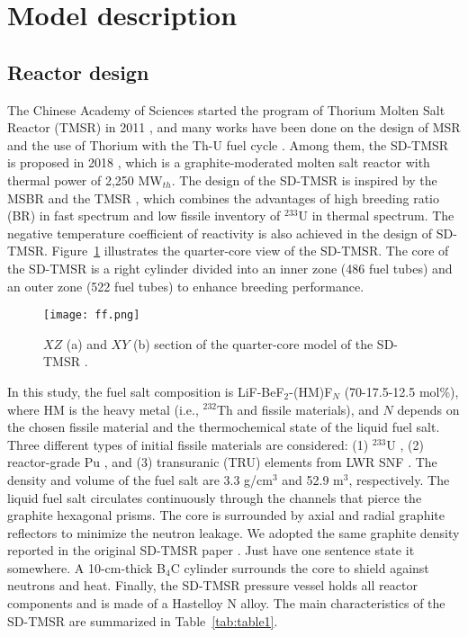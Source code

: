 \section{Model description} \label{Model-description}
\subsection{Reactor design}

The Chinese Academy of Sciences started the program of Thorium Molten Salt Reactor (TMSR) in 2011 \cite{jiang2012advanced}, and many works have been done on the design of MSR and the use of Thorium with the Th-U fuel cycle \cite{li_optimization_2018,li2015analysis}. Among them, the SD-TMSR is proposed in 2018 \cite{li_optimization_2018}, which is a graphite-moderated molten salt reactor with thermal power of 2,250 MW$_{th}$. The design of the SD-TMSR is inspired by the \gls{MSBR} \cite{robertson_conceptual_1971} and the \gls{TMSR} \cite{nuttin2005potential}, which combines the advantages of high breeding ratio (BR) in fast spectrum and low fissile inventory of $^{233}$U in thermal spectrum. The negative temperature coefficient of reactivity is also achieved in the design of SD-TMSR. Figure~\ref{fig:ff} illustrates the quarter-core view of the 
SD-TMSR. The core of the 
SD-TMSR is a right cylinder divided into an inner zone (486 fuel tubes) 
and an outer zone (522 fuel tubes) to enhance breeding performance.
\begin{figure} %
	\texttt{[image: ff.png]}
	\caption{$XZ$ (a) and $XY$ (b) section of the quarter-core model of the 
		SD-TMSR \cite{ashraf2019Preliminary}.}
	\label{fig:ff}
\end{figure}
In this study, the fuel salt composition is LiF-BeF$_2$-(HM)F$_N$ (70-17.5-12.5 mol\%),
where HM is the heavy metal (i.e., $^{232}$Th and fissile 
materials), and $N$ depends on the chosen fissile material and the 
thermochemical state of the liquid fuel salt. Three different types of initial 
fissile materials are considered: (1) $^{233}$U \cite{ashraf2020whole}, 
(2) reactor-grade Pu \cite{marka1993explosive}, and (3) transuranic (TRU) 
elements from \gls{LWR} \gls{SNF} \cite{de2000scenarios}.
The density and volume of the fuel salt are 3.3 g/cm$^{3}$ and 52.9 m$^3$, 
respectively. The liquid fuel salt circulates continuously through the channels
that pierce the graphite hexagonal prisms. The core is surrounded by 
axial and radial graphite reflectors to minimize the neutron leakage.
We adopted the same graphite density reported in the original SD-TMSR paper \cite{li_optimization_2018}.
Just have one sentence state it somewhere.
A 10-cm-thick B$_4$C cylinder surrounds the core to shield against neutrons and heat.
Finally, the SD-TMSR pressure vessel holds all reactor components and is made of 
a Hastelloy N alloy. The main characteristics of the SD-TMSR are 
summarized in Table~\ref{tab:table1}.


